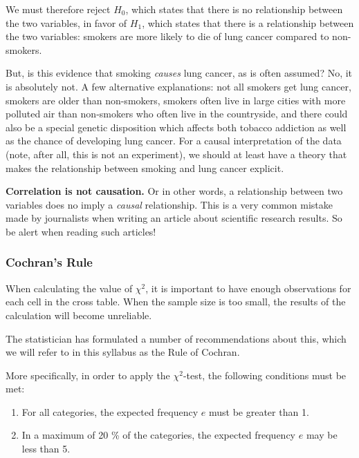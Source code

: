 We must therefore reject $H_{0}$, which states that there is no relationship between the two variables, in favor of $H_{1}$, which states that there is a relationship between the two variables: smokers are more likely to die of lung cancer compared to non-smokers.

But, is this evidence that smoking \emph{causes} lung cancer, as is often assumed? No, it is absolutely not. A few alternative explanations: not all smokers get lung cancer, smokers are older than non-smokers, smokers often live in large cities with more polluted air than non-smokers who often live in the countryside, and there could also be a special genetic disposition which affects both tobacco addiction as well as the chance of developing lung cancer. For a causal interpretation of the data (note, after all, this is not an experiment), we should at least have a theory that makes the relationship between smoking and lung cancer explicit.

\begin{remark}[!!]
  \textbf{Correlation is not causation.} Or in other words, a relationship between two variables does no imply a \emph{causal} relationship. This is a very common mistake made by journalists when writing an article about scientific research results. So be alert when reading such articles!
\end{remark}

\subsubsection{Cochran's Rule}

When calculating the value of $\chi^2$, it is important to have enough observations for each cell in the cross table. When the sample size is too small, the results of the calculation will become unreliable.

The statistician \textcite{Cochran1954} has formulated a number of recommendations about this, which we will refer to in this syllabus as the Rule of Cochran.

More specifically, in order to apply the $\chi^2$-test, the following conditions must be met:

\begin{enumerate}
  \item For all categories, the expected frequency $e$ must be greater than 1.
  \item In a maximum of 20 \% of the categories, the expected frequency $e$ may be less than 5.
\end{enumerate}

